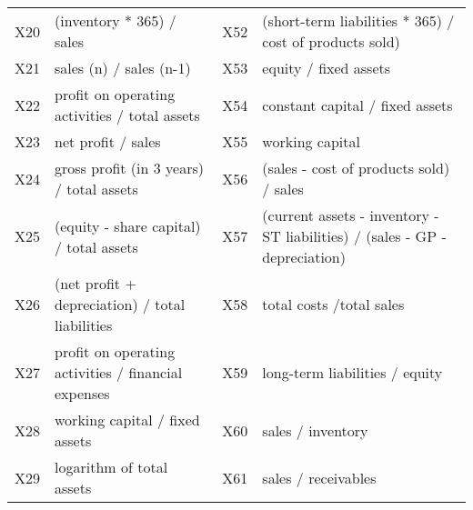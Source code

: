 \documentclass[12pt]{article}  %
\theoremstyle{definition}
\theoremstyle{remark}
\begin{document}
\begin{table}[!h]
{\begin{tabular}{llll}
X20 & (inventory * 365) / sales                                                                                                & X52 & (short-term liabilities * 365) / cost of products sold)                                       \\
X21 & sales (n) / sales (n-1)                                                                                                  & X53 & equity / fixed assets                                                                         \\
X22 & profit on operating activities / total assets                                                                            & X54 & constant capital / fixed assets                                                               \\
X23 & net profit / sales                                                                                                       & X55 & working capital                                                                               \\
X24 & gross profit (in 3 years) / total assets                                                                                 & X56 & (sales - cost of products sold) / sales                                                       \\
X25 & (equity - share capital) / total assets                                                                                  & X57 & (current assets - inventory - ST liabilities) / (sales - GP - depreciation) \\
X26 & (net profit + depreciation) / total liabilities                                                                          & X58 & total costs /total sales                                                                      \\
X27 & profit on operating activities / financial expenses                                                                      & X59 & long-term liabilities / equity                                                                \\
X28 & working capital / fixed assets                                                                                           & X60 & sales / inventory                                                                             \\
X29 & logarithm of total assets                                                                                                & X61 & sales / receivables                                                                           \\

\end{tabular}}
\end{table}
\end{document}
